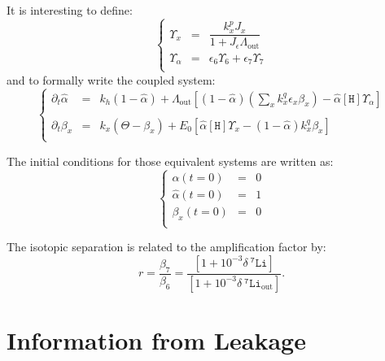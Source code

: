 \documentclass[aps,onecolumn,11pt]{revtex4}
\newcommand{\mychem}[1]{\mathtt{#1}}
\newcommand{\myconc}[1]{\left\lbrack{#1}\right\rbrack}
\newcommand{\spLi}[1]{{~^{\mychem{#1}}\mychem{Li}}}
\newcommand{\spproton}{\mychem{H}}
\newcommand{\proton}{\myconc{\spproton}}
\newcommand{\deltaLi}{ {\delta\!\!\!\spLi{7}} }
\newcommand{\deltaLiOut}{{\deltaLi}_{\mathrm{out}}}
\newcommand{\LiAll}{\Lambda}
\newcommand{\LiAllOut}{{\LiAll}_{\mathrm{out}}}
\begin{document}
It is interesting to define:
\begin{equation}
\label{eq:upsilon}
\left\lbrace
\begin{array}{rcl}
	\Upsilon_x & = & \dfrac{k^p_x J_x}{1+J_\epsilon \LiAllOut}\\
	\Upsilon_\alpha & = & \epsilon_6 \Upsilon_6 + \epsilon_7 \Upsilon_7\\
\end{array}
\right.
\end{equation}
and to formally write the coupled system:
\begin{equation}
\label{eq:sysall}
\left\lbrace
\begin{array}{rcl}
\partial_t \hat\alpha & = &
	 k_h \left(1-\hat\alpha\right) 
	 + \LiAllOut \left[ (1-\hat\alpha) \left( {\sum_x k_x^q \epsilon_x \beta_x} \right)  - \hat\alpha\proton \Upsilon_\alpha \right]\\
	 \\
	\partial_t \beta_x & = & k_x\left(\Theta - \beta_x\right) +E_0\left[ \hat\alpha  \proton \Upsilon_x - (1-\hat\alpha) k^q_x \beta_x \right]\\
\end{array}
\right.
\end{equation}

The initial conditions for those equivalent systems are written as:
\begin{equation}
\label{eq:ini}
\left\lbrace
\begin{array}{rcl}
\alpha(t=0) & = & 0\\
\hat\alpha(t=0) &= & 1\\
\beta_x(t=0)    &=& 0\\
\end{array}
\right.
\end{equation}

The isotopic separation is related to the amplification factor by:
\begin{equation}
	r=\dfrac{ \beta_7}{\beta_6} = \dfrac{\left[1+10^{-3}\deltaLi\right]}{\left[1+10^{-3}\deltaLiOut\right]}
	.
\end{equation}

\section{Information from Leakage}
\end{document}
